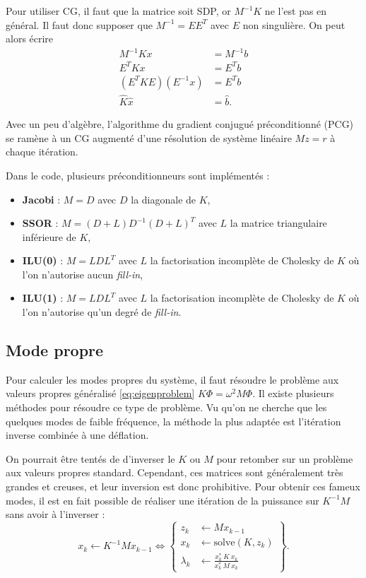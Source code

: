 \documentclass[12pt]{article}
\begin{document}
Pour utiliser CG, il faut que la matrice soit SDP, or $M^{-1} K$ ne l'est pas 
en général. Il faut donc supposer que $M^{-1}=EE^T$ avec $E$ non singulière.
On peut alors écrire
\begin{equation}
    \begin{aligned}
        M^{-1} K x &= M^{-1} b\\
        E^T K x &= E^T b\\
        (E^T K E) (E^{-1} x) &= E^T b\\
        \hat K \hat x &= \hat b.
    \end{aligned}
\end{equation}

Avec un peu d'algèbre, l'algorithme du gradient conjugué 
préconditionné (PCG) se ramène à un CG augmenté d'une résolution de 
système linéaire $Mz=r$ à chaque itération. 

Dans le code, plusieurs préconditionneurs sont implémentés : 
\begin{itemize}
    \item \textbf{Jacobi} : $M = D$ avec $D$ la diagonale de $K$,
    \item \textbf{SSOR} : $M = (D + L) D^{-1} (D + L)^T$ avec $L$ la matrice
    triangulaire inférieure de $K$,
    \item \textbf{ILU(0)} : $M=L D L^T$ avec $L$ la factorisation incomplète
    de Cholesky de $K$ où l'on n'autorise aucun \textit{fill-in},
    \item \textbf{ILU(1)} : $M=L D L^T$ avec $L$ la factorisation incomplète
    de Cholesky de $K$ où l'on n'autorise qu'un degré de \textit{fill-in}.
\end{itemize}

\subsection{Mode propre}
Pour calculer les modes propres du système, il faut résoudre le problème aux
valeurs propres généralisé \eqref{eq:eigenproblem} $K \Phi = \omega^2 M \Phi$.
Il existe plusieurs méthodes pour résoudre ce type de problème. Vu qu'on ne 
cherche que les quelques modes de faible fréquence, la méthode la plus adaptée 
est l'itération inverse combinée à une déflation.

On pourrait être tentés de d'inverser le $K$ ou $M$ pour retomber sur un
problème aux valeurs propres standard. Cependant, ces matrices sont
généralement très grandes et creuses, et leur inversion est donc prohibitive.
Pour obtenir ces fameux modes, il est en fait possible de réaliser une 
itération de la puissance sur $K^{-1} M$ sans avoir à l'inverser :
\begin{equation}
    x_{k} \gets K^{-1} M x_{k-1} \iff
    \left\{\begin{aligned}
        z_{k} &\gets M x_{k-1}\\
        x_{k} &\gets \textrm{solve}(K, z_{k})\\
        \lambda_{k} &\gets \frac{x_{k}^* \:K\: x_{k}}{x_{k}^* \:M\: x_{k}}
    \end{aligned}\right\} .
\end{equation}
\end{document}
